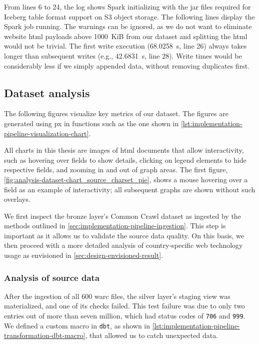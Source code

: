 From lines 6 to 24, the log shows Spark initializing with the \ac{jar} files required for Iceberg table format support on S3 object storage.
The following lines display the Spark job running.
The warnings can be ignored, as we do not want to eliminate website \ac{html} payloads above 1000~KiB from our dataset and splitting the \ac{html} would not be trivial.
The first write execution (68.0258~s, line 26) always takes longer than subsequent writes (e.g., 42.6831~s, line 28).
Write times would be considerably less if we simply appended data, without removing duplicates first.


\subsection{Dataset analysis}
\label{sec:analysis-dataset}

The following figures visualize key metrics of our dataset.
The figures are generated using \ac{px} in functions such as the one shown in \cref{lst:implementation-pipeline-visualization-chart}.

All charts in this thesis are images of \ac{html} documents that allow interactivity, such as hovering over fields to show details, clicking on legend elements to hide respective fields, and zooming in and out of graph areas.
The first figure, \cref{fig:analysis-dataset-chart_source_charset_pie}, shows a mouse hovering over a field as an example of interactivity; all subsequent graphs are shown without such overlays.

We first inspect the bronze layer's Common Crawl dataset as ingested by the methods outlined in \cref{sec:implementation-pipeline-ingestion}.
This step is important as it allows us to validate the source data quality.
On this basis, we then proceed with a more detailed analysis of country-specific web technology usage as envisioned in \cref{sec:design-envisioned-result}.


\subsubsection{Analysis of source data}
\label{sec:analysis-dataset-source}

After the ingestion of all 600 \ac{warc} files, the silver layer's staging view was materialized, and one of its checks failed.
This test failure was due to only two entries out of more than seven million, which had status codes of \texttt{706} and \texttt{999}.
We defined a custom macro in \texttt{dbt}, as shown in \cref{lst:implementation-pipeline-transformation-dbt-macro}, that allowed us to catch unexpected data.


